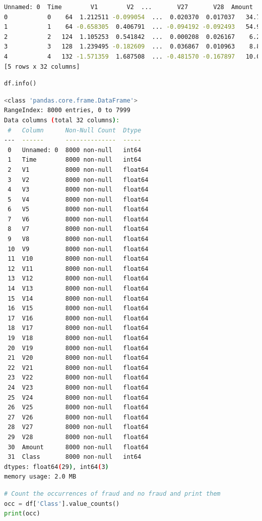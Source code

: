 \begin{lstlisting}[language={bash}]
   Unnamed: 0  Time        V1        V2  ...       V27       V28  Amount  Class
0           0    64  1.212511 -0.099054  ...  0.020370  0.017037   34.70      0
1           1    64 -0.658305  0.406791  ... -0.094192 -0.092493   54.99      0
2           2   124  1.105253  0.541842  ...  0.000208  0.026167    6.24      0
3           3   128  1.239495 -0.182609  ...  0.036867  0.010963    8.80      0
4           4   132 -1.571359  1.687508  ... -0.481570 -0.167897   10.00      0
[5 rows x 32 columns]
\end{lstlisting}

\begin{lstlisting}[language={python}]
df.info()
\end{lstlisting}

\begin{lstlisting}[language={bash}]
<class 'pandas.core.frame.DataFrame'>
RangeIndex: 8000 entries, 0 to 7999
Data columns (total 32 columns):
 #   Column      Non-Null Count  Dtype  
---  ------      --------------  -----  
 0   Unnamed: 0  8000 non-null   int64  
 1   Time        8000 non-null   int64  
 2   V1          8000 non-null   float64
 3   V2          8000 non-null   float64
 4   V3          8000 non-null   float64
 5   V4          8000 non-null   float64
 6   V5          8000 non-null   float64
 7   V6          8000 non-null   float64
 8   V7          8000 non-null   float64
 9   V8          8000 non-null   float64
 10  V9          8000 non-null   float64
 11  V10         8000 non-null   float64
 12  V11         8000 non-null   float64
 13  V12         8000 non-null   float64
 14  V13         8000 non-null   float64
 15  V14         8000 non-null   float64
 16  V15         8000 non-null   float64
 17  V16         8000 non-null   float64
 18  V17         8000 non-null   float64
 19  V18         8000 non-null   float64
 20  V19         8000 non-null   float64
 21  V20         8000 non-null   float64
 22  V21         8000 non-null   float64
 23  V22         8000 non-null   float64
 24  V23         8000 non-null   float64
 25  V24         8000 non-null   float64
 26  V25         8000 non-null   float64
 27  V26         8000 non-null   float64
 28  V27         8000 non-null   float64
 29  V28         8000 non-null   float64
 30  Amount      8000 non-null   float64
 31  Class       8000 non-null   int64  
dtypes: float64(29), int64(3)
memory usage: 2.0 MB
\end{lstlisting}

\begin{lstlisting}[language={python}]
# Count the occurrences of fraud and no fraud and print them
occ = df['Class'].value_counts()
print(occ)
\end{lstlisting}

